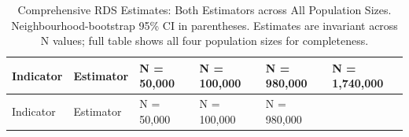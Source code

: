 \documentclass[
  12pt,
  letterpaper,
  DIV=11,
  numbers=noendperiod]{scrreprt}
\begin{document}
\begin{longtable}[]{@{}
  >{\raggedright\arraybackslash}p{}
  >{\raggedright\arraybackslash}p{}
  >{\raggedright\arraybackslash}p{}
  >{\raggedright\arraybackslash}p{}
  >{\raggedright\arraybackslash}p{}
  >{\raggedright\arraybackslash}p{}@{}}
\caption{Comprehensive RDS Estimates: Both Estimators across All
Population Sizes. Neighbourhood-bootstrap 95\% CI in parentheses.
Estimates are invariant across N values; full table shows all four
population sizes for
completeness.}\label{tbl-rds-comparison}\tabularnewline
\toprule\noalign{}
\begin{minipage}[b]{\linewidth}\raggedright
Indicator
\end{minipage} & \begin{minipage}[b]{\linewidth}\raggedright
Estimator
\end{minipage} & \begin{minipage}[b]{\linewidth}\raggedright
N = 50,000
\end{minipage} & \begin{minipage}[b]{\linewidth}\raggedright
N = 100,000
\end{minipage} & \begin{minipage}[b]{\linewidth}\raggedright
N = 980,000
\end{minipage} & \begin{minipage}[b]{\linewidth}\raggedright
N = 1,740,000
\end{minipage} \\
\midrule\noalign{}
\endfirsthead
\toprule\noalign{}
\begin{minipage}[b]{\linewidth}\raggedright
Indicator
\end{minipage} & \begin{minipage}[b]{\linewidth}\raggedright
Estimator
\end{minipage} & \begin{minipage}[b]{\linewidth}\raggedright
N = 50,000
\end{minipage} & \begin{minipage}[b]{\linewidth}\raggedright
N = 100,000
\end{minipage} & \begin{minipage}[b]{\linewidth}\raggedright
N = 980,000
\end{minipage} & \begin{minipage}[b]{\linewidth}\raggedright

\end{minipage}
\end{longtable}
\end{document}
